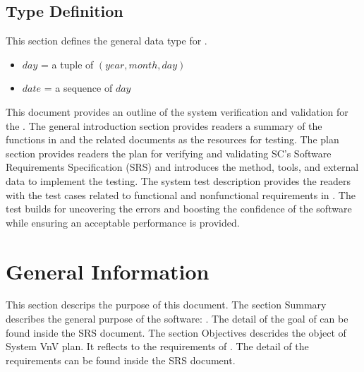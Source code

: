 \documentclass[12pt, titlepage]{article}
\begin{document}
\subsection{Type Definition}\label{C_TD}
This section defines the general data type for \progname. 

\begin{itemize}
\item[]$\mathit{day} $ = a tuple of $(\mathit{year}, \mathit{month}, \mathit{day})$
\item[]$\mathit{date}$ = a sequence of $\mathit{day}$
\end{itemize} 




\newpage


This document provides an outline of the system verification and validation for
the \progname. The general introduction section provides readers a summary of
the functions in \progname{} and the related documents as the resources for
testing. The plan section provides readers the plan for verifying and
validating SC's Software Requirements Specification (SRS) and introduces the
method, tools, and external data to implement the testing. The system test
description
provides the readers with the test cases related to functional and nonfunctional
requirements in \progname. The test builds for uncovering the errors and
boosting the confidence of the software while ensuring an acceptable
performance is provided. 



\section{General Information}

This section descrips the purpose of this document. The section Summary describes the general purpose of the software: \progname. The detail of the goal of \progname can be found inside the SRS document. The section Objectives descrides the object of  System VnV plan. It reflects to the requirements of \progname. The detail of the requirements can be found inside the SRS document. 
\end{document}
